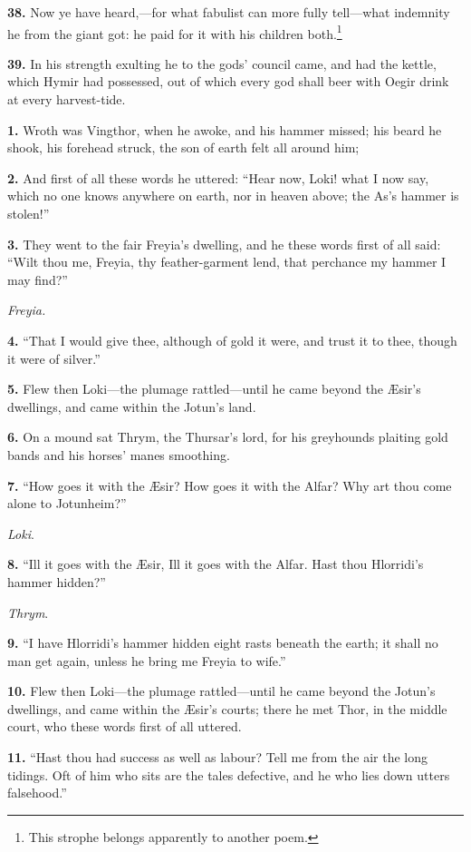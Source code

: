 \textbf{38.} Now ye have heard,—for what fabulist can more fully tell—what
indemnity he from the giant got: he paid for it with his children
both.\footnote{This strophe belongs apparently to another poem.}

\textbf{39.} In his strength exulting he to the gods' council came, and had
the kettle, which Hymir had possessed, out of which every god shall
beer with Oegir drink at every harvest-tide.


\textbf{1.} Wroth was Vingthor, when he awoke, and his hammer missed; his
beard he shook, his forehead struck, the son of earth felt all around
him;

\textbf{2.} And first of all these words he uttered: ``Hear now, Loki! what I
now say, which no one knows anywhere on earth, nor in heaven above;
the As's hammer is stolen!''

\textbf{3.} They went to the fair Freyia's dwelling, and he these words first
of all said: ``Wilt thou me, Freyia, thy feather-garment lend, that
perchance my hammer I may find?''

\emph{Freyia.}

\textbf{4.} ``That I would give thee, although of gold it were, and trust it
to thee, though it were of silver.''

\textbf{5.} Flew then Loki—the plumage rattled—until he came beyond the
Æsir's dwellings, and came within the Jotun's land.

\textbf{6.} On a mound sat Thrym, the Thursar's lord, for his greyhounds
plaiting gold bands and his horses' manes smoothing.

\textbf{7.} ``How goes it with the Æsir? How goes it with the Alfar? Why art
thou come alone to Jotunheim?''

\emph{Loki}.

\textbf{8.} ``Ill it goes with the Æsir, Ill it goes with the Alfar. Hast thou
Hlorridi's hammer hidden?''

\emph{Thrym}.

\textbf{9.} ``I have Hlorridi's hammer hidden eight rasts beneath the earth;
it shall no man get again, unless he bring me Freyia to wife.''

\textbf{10.} Flew then Loki—the plumage rattled—until he came beyond the
Jotun's dwellings, and came within the Æsir's courts; there he met
Thor, in the middle court, who these words first of all uttered.

\textbf{11.} ``Hast thou had success as well as labour? Tell me from the air
the long tidings. Oft of him who sits are the tales defective, and he
who lies down utters falsehood.''

